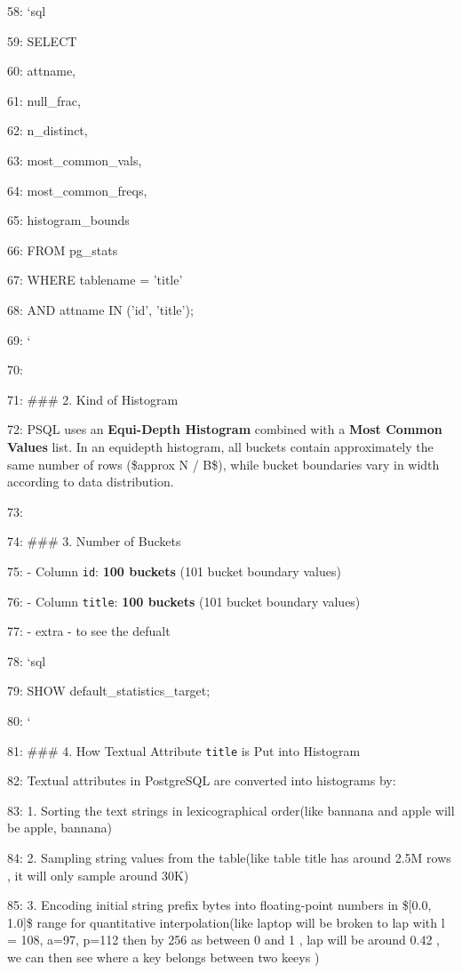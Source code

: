 \documentclass[11pt,a4paper]{article}
\begin{document}
{58: \texttt{}`sql

59: SELECT

60:     attname,

61:     null\_frac,

62:     n\_distinct,

63:     most\_common\_vals,

64:     most\_common\_freqs,

65:     histogram\_bounds

66: FROM pg\_stats

67: WHERE tablename = 'title'

68:   AND attname IN ('id', 'title');

69: \texttt{}`

70:

71: \#\#\# 2. Kind of Histogram

72: PSQL uses an \textbf{Equi-Depth Histogram} combined with a \textbf{Most Common Values} list. In an equidepth histogram, all buckets contain approximately the same number of rows (\$approx N / B\$), while bucket boundaries vary in width according to data distribution.

73:

74: \#\#\# 3. Number of Buckets

75: - Column \texttt{id}: \textbf{100 buckets} (101 bucket boundary values)

76: - Column \texttt{title}: \textbf{100 buckets} (101 bucket boundary values)

77: - extra -  to see the defualt

78: \texttt{}`sql

79: SHOW default\_statistics\_target;

80: \texttt{}`

81: \#\#\# 4. How Textual Attribute \texttt{title} is Put into Histogram

82: Textual attributes in PostgreSQL are converted into histograms by:

83: 1. Sorting the text strings in lexicographical order(like bannana and apple will be apple, bannana)

84: 2. Sampling string values from the table(like table title has around 2.5M rows , it will only sample around 30K)

85: 3. Encoding initial string prefix bytes into floating-point numbers in \$[0.0, 1.0]\$ range for quantitative interpolation(like laptop will be broken to lap with l = 108, a=97, p=112 then by 256 as between 0 and 1 , lap will be around 0.42 , we can then see where a key belongs between two keeys )

}
\end{document}
